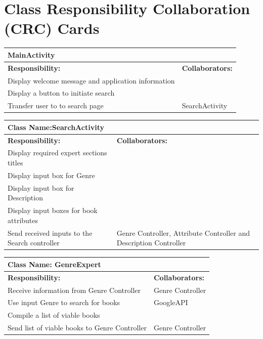 \documentclass[12pt]{article}
\begin{document}
\section{Class Responsibility Collaboration (CRC) Cards}
\label{sec:class_responsibility_collaboration_crc_cards}
	\begin{table}[H]
		\centering
		\begin{tabular}{|p{5cm}|p{5cm}|}
		\hline 
		 \multicolumn{2}{|l|}{\textbf{MainActivity}} \\
		\hline
		\textbf{Responsibility:} & \textbf{Collaborators:} \\
		\hline
		 Display welcome message and application information & \\
		\hline
		Display a button to initiate search & \\
		\hline
		Transfer user to to search page & SearchActivity \\
		\hline
		\end{tabular}
	\end{table}
	

	\begin{table}[H]
		\centering
		\begin{tabular}{|p{5cm}|p{5cm}|}
		\hline 
		 \multicolumn{2}{|l|}{\textbf{Class Name:SearchActivity}} \\
		\hline
		\textbf{Responsibility:} & \textbf{Collaborators:} \\
		\hline
		Display required expert sections titles & \\
		\hline
		Display input box for Genre & \\
		\hline
		Display input box for Description & \\
		\hline
		Display input boxes for book attributes & \\
		\hline
		Send received inputs to the Search controller & Genre Controller, Attribute Controller and Description Controller \\
		\hline
		\end{tabular}
	\end{table}
	
	\begin{table}[H]
		\centering
		\begin{tabular}{|p{5cm}|p{5cm}|}
		\hline 
		 \multicolumn{2}{|l|}{\textbf{Class Name: GenreExpert}} \\
		\hline
		\textbf{Responsibility:} & \textbf{Collaborators:} \\
		\hline
		 Receive information from Genre Controller & Genre Controller \\
		\hline
		 Use input Genre to search for books & GoogleAPI \\
		 \hline
		 Compile a list of viable books & \\
		 \hline
		 Send list of viable books to Genre Controller & Genre Controller \\
		 \hline
		\end{tabular}
	\end{table}
	
\end{document}
